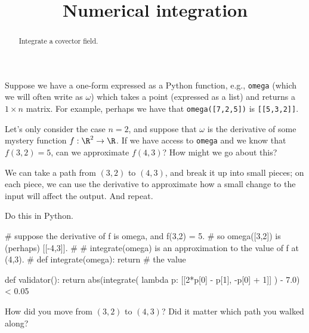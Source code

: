 \documentclass{ximera}
\title{Numerical integration}
\begin{document}
\begin{abstract}
  Integrate a covector field.
\end{abstract}

\begin{exercise}
  Suppose we have a one-form expressed as a Python function, e.g., \texttt{omega} (which we will often write as $\omega$) which takes a point (expressed as a list) and returns a $1 \times n$ matrix.  For example, perhaps we have that \texttt{omega([7,2,5])} is \texttt{[[5,3,2]]}.

  Let's only consider the case $n = 2$, and suppose that $\omega$ is
  the derivative of some mystery function $f : \R^2 \to \R$.  If we
  have access to \texttt{omega} and we know that $f(3,2) = 5$, can we
  approximate $f(4,3)$?  How might we go about this?

  We can take a path from $(3,2)$ to $(4,3)$, and break it up into
  small pieces; on each piece, we can use the derivative to
  approximate how a small change to the input will affect the output.
  And repeat.

  Do this in Python.

  \begin{solution}
    \begin{python}
# suppose the derivative of f is omega, and f(3,2) = 5.
# so omega([3,2]) is (perhaps) [[-4,3]].
#
# integrate(omega) is an approximation to the value of f at (4,3).
#
def integrate(omega):
  return # the value

def validator():
  return abs(integrate( lambda p: [[2*p[0] - p[1], -p[0] + 1]] ) - 7.0) < 0.05
    \end{python}
  \end{solution}

How did you move from $(3,2)$ to $(4,3)$?  Did it matter which path you walked along?

\end{exercise}
\end{document}
